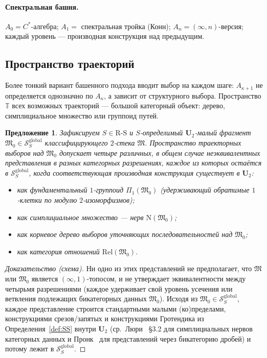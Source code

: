 \documentclass[11pt]{article}
\theoremstyle{plain}
\newtheorem{proposition}[theorem]{Предложение}
\theoremstyle{definition}
\newcommand{\RS}{\mathrm{R\text{-}S}}
\newcommand{\cS}{\mathcal{S}}
\newcommand{\fM}{\mathfrak{M}}
\begin{document}
\paragraph{Спектральная башня.} $A_0 = C^*$-алгебра; $A_1 = $ спектральная тройка (Конн); $A_n = (\infty, n)$-версия; каждый уровень — производная конструкция над предыдущим.

\subsection{Пространство траекторий}

Более тонкий вариант башенного подхода вводит выбор на каждом шаге: $A_{\kappa+1}$ не определяется однозначно по $A_\kappa$, а зависит от структурного выбора. Пространство $\mathbb{T}$ всех возможных траекторий — большой категорный объект: дерево, симплициальное множество или группоид путей.

\begin{proposition}\label{prop:trajectory-space}
Зафиксируем $S \in \RS$ и $S$-определимый $\mathbf{U}_2$-малый фрагмент $\fM_0 \in \cS_S^{\mathrm{global}}$ классифицирующего $2$-стека $\fM$. Пространство траекторных выборов над $\fM_0$ допускает четыре различных, в общем случае неэквивалентных представления в разных категорных разрешениях, каждое из которых остаётся в $\cS_S^{\mathrm{global}}$, когда соответствующая производная конструкция существует в $\mathbf{U}_2$:
\begin{itemize}
\item как фундаментальный $1$-группоид $\Pi_1(\fM_0)$ (удерживающий обратимые $1$-клетки по модулю $2$-изоморфизмов);
\item как симплициальное множество — нерв $\mathrm{N}(\fM_0)$;
\item как корневое дерево выборов уточняющих последовательностей над $\fM_0$;
\item как категория отношений $\mathrm{Rel}(\fM_0)$.
\end{itemize}
\end{proposition}

\begin{proof}[Доказательство (схема)]
Ни одно из этих представлений не предполагает, что $\fM$ или $\fM_0$ является $(\infty, 1)$-топосом, и не утверждает эквивалентности между четырьмя разрешениями (каждое удерживает свой уровень усечения или ветвления подлежащих бикатегорных данных $\fM_0$). Исходя из $\fM_0 \in \cS_S^{\mathrm{global}}$, каждое представление строится стандартными малыми (ко)пределами, конструкциями срезов/запятых и конструкциями Гротендика из Определения~\ref{def:SS} внутри $\mathbf{U}_2$ (ср.\ Люри~\cite{LurieHTT} \S 3.2 для симплициальных нервов категорных данных и Пронк~\cite{Pronk1996} для представлений через бикатегорию дробей) и потому лежит в $\cS_S^{\mathrm{global}}$.
\end{proof}
\end{document}
